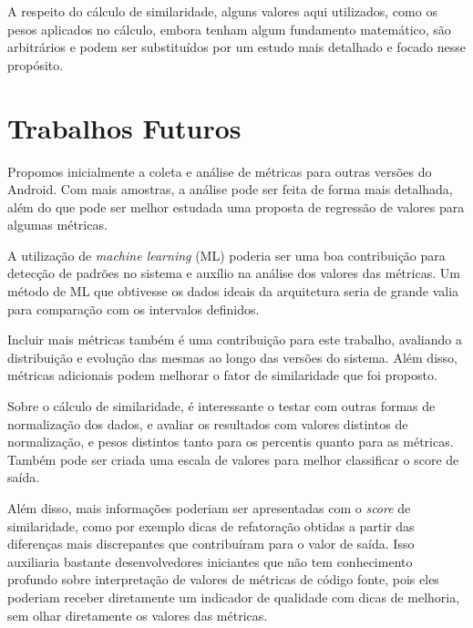A respeito do cálculo de similaridade, alguns valores aqui utilizados, como os pesos aplicados no cálculo, embora tenham algum fundamento matemático, são arbitrários e podem ser substituídos por um estudo mais detalhado e focado nesse propósito.

\section{Trabalhos Futuros}

Propomos inicialmente a coleta e análise de métricas para outras versões do Android. Com mais amostras, a análise pode ser feita de forma mais detalhada, além do que pode ser melhor estudada uma proposta de regressão de valores para algumas métricas.

A utilização de \textit{machine learning} (ML) poderia ser uma boa contribuição para detecção de padrões no sistema e auxílio na análise dos valores das métricas. Um método de ML que obtivesse os dados ideais da arquitetura seria de grande valia para comparação com os intervalos definidos.

Incluir mais métricas também é uma contribuição para este trabalho, avaliando a distribuição e evolução das mesmas ao longo das versões do sistema. Além disso, métricas adicionais podem melhorar o fator de similaridade que foi proposto.

Sobre o cálculo de similaridade, é interessante o testar com outras formas de normalização dos dados, e avaliar os resultados com valores distintos de normalização, e pesos distintos tanto para os percentis quanto para as métricas. Também pode ser criada uma escala de valores para melhor classificar o score de saída.

Além disso, mais informações poderiam ser apresentadas com o \textit{score} de similaridade, como por exemplo dicas de refatoração obtidas a partir das diferenças mais discrepantes que contribuíram para o valor de saída. Isso auxiliaria bastante desenvolvedores iniciantes que não tem conhecimento profundo sobre interpretação de valores de métricas de código fonte, pois eles poderiam receber diretamente um indicador de qualidade com dicas de melhoria, sem olhar diretamente os valores das métricas.